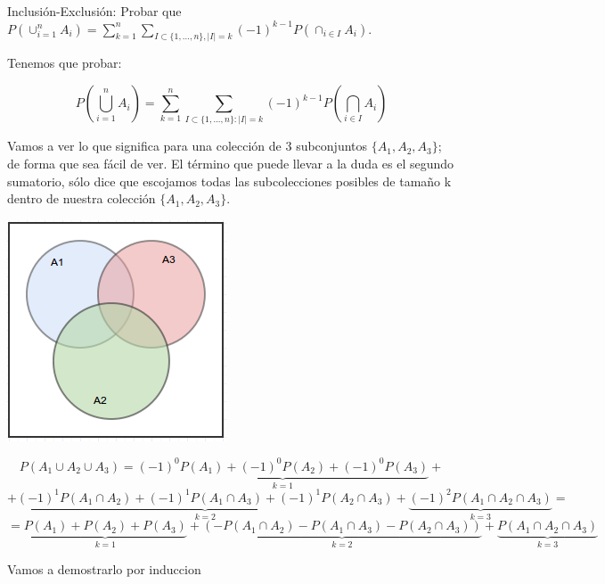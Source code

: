\begin{problem}[10]Inclusi\'on-Exclusi\'on: Probar que 
$
P(\cup_{i=1}^n A_i)= \sum_{k=1}^n \sum_{I\subset \{1, \dots, n\}, |I| = k} (-1)^{k-1}
P(\cap_{i\in I} A_i).
$
\solution

\begin{expla}

Tenemos que probar:

\[
P(\bigcup_{i=1}^nA_i)=\sum_{k=1}^{n}\sum_{I\subset \{1,...,n\}:|I|=k}(-1)^{k-1}P(\bigcap_{i\in I}A_i)
\]

Vamos a ver lo que significa para una colección de 3 subconjuntos $\{A_1,A_2,A_3\}$; de forma que sea fácil de ver. El término que puede llevar a la duda es el segundo sumatorio, sólo dice que escojamos todas las subcolecciones posibles de tamaño k dentro de nuestra colección $\{A_1,A_2,A_3\}$.

\begin{center}
\includegraphics[scale=0.75]{img/Dvenn4.png}
\end{center}

\[
P(A_1\cup A_2 \cup A_3)=\underbrace{(-1)^0P(A_1)+(-1)^0P(A_2)+(-1)^0P(A_3)}_{k=1}+
\]
\[
+\underbrace{(-1)^1P(A_1\cap A_2)+(-1)^1P(A_1\cap A_3)+(-1)^1P(A_2\cap A_3)}_{k=2}+\underbrace{(-1)^2P(A_1\cap A_2\cap A_3)}_{k=3}=
\]
\[
=\underbrace{P(A_1)+P(A_2)+P(A_3)}_{k=1}+\underbrace{(-P(A_1\cap A_2)-P(A_1\cap A_3)-P(A_2\cap A_3))}_{k=2}+\underbrace{P(A_1\cap A_2\cap A_3)}_{k=3}
\]

\end{expla}

Vamos a demostrarlo por induccion

\end{problem}


